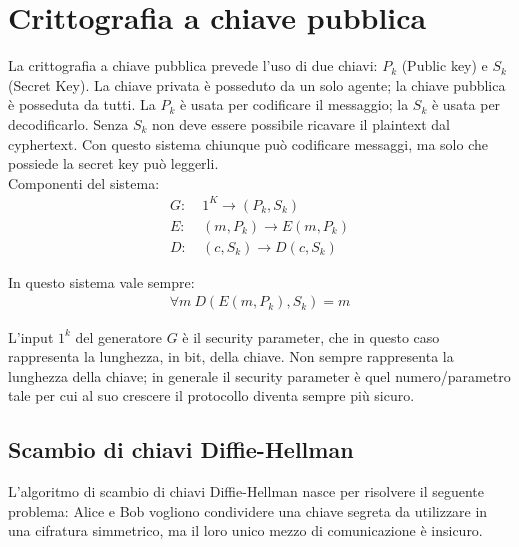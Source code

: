 \chapter{Crittografia a chiave pubblica}
\label{chapter4}

La crittografia a chiave pubblica prevede l'uso di due chiavi: $P_k$ (Public key) e $S_k$ (Secret Key). La chiave privata è posseduto da un solo agente; la chiave pubblica è posseduta da tutti. La $P_k$ è usata per codificare il messaggio; la $S_k$ è usata per decodificarlo. Senza $S_k$ non deve essere possibile ricavare il plaintext dal cyphertext. Con questo sistema chiunque può codificare messaggi, ma solo che possiede la secret key può leggerli.\\

\noindent Componenti del sistema:
\begin{align*}
    G: \ &1^K \rightarrow (P_k, S_k)\\
    E: \ &(m, P_k) \rightarrow E(m, P_k)\\
    D: \ &(c, S_k) \rightarrow D(c, S_k)
\end{align*}

\noindent In questo sistema vale sempre:
\begin{align*}
   \forall m \ D(E(m, P_k), S_k) = m
\end{align*}

\noindent L'input $1^k$ del generatore $G$ è il security parameter, che in questo caso rappresenta la lunghezza, in bit, della chiave. Non sempre rappresenta la lunghezza della chiave; in generale il security parameter è quel numero/parametro tale per cui al suo crescere il protocollo diventa sempre più sicuro.

\section{Scambio di chiavi Diffie-Hellman}

L'algoritmo di scambio di chiavi Diffie-Hellman nasce per risolvere il seguente problema: Alice e Bob vogliono condividere una chiave segreta da utilizzare in una cifratura simmetrico, ma il loro unico mezzo di comunicazione è insicuro.

